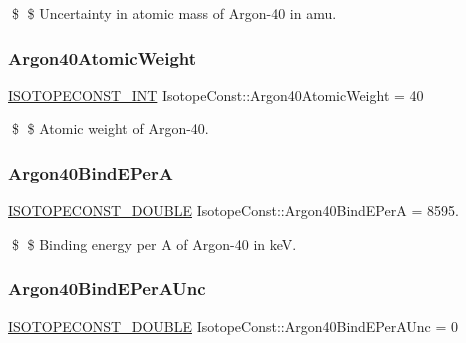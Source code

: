 \$ \$ Uncertainty in atomic mass of Argon-\/40 in amu. \mbox{\label{group___isotope_const-_argon-_ar40_ga756718f3086c996b8d304abd09b94c1a}} 
\subsubsection{\texorpdfstring{Argon40\+Atomic\+Weight}{Argon40AtomicWeight}}
{\footnotesize\ttfamily \mbox{\hyperlink{group___isotope_const-_macros_ga5f18360b3e99483a35c32d789e62621c}{I\+S\+O\+T\+O\+P\+E\+C\+O\+N\+S\+T\+\_\+\+I\+NT}} Isotope\+Const\+::\+Argon40\+Atomic\+Weight = 40}

\$ \$ Atomic weight of Argon-\/40. \mbox{\label{group___isotope_const-_argon-_ar40_ga6fec049790b58dad626c0cb5ead2e817}} 
\subsubsection{\texorpdfstring{Argon40\+Bind\+E\+PerA}{Argon40BindEPerA}}
{\footnotesize\ttfamily \mbox{\hyperlink{group___isotope_const-_macros_ga8f45a7272ce02c0b4c65c44636ed719a}{I\+S\+O\+T\+O\+P\+E\+C\+O\+N\+S\+T\+\_\+\+D\+O\+U\+B\+LE}} Isotope\+Const\+::\+Argon40\+Bind\+E\+PerA = 8595.}

\$ \$ Binding energy per A of Argon-\/40 in keV. \mbox{\label{group___isotope_const-_argon-_ar40_ga9b212a71643c16fc780de85ba5ddd0ac}} 
\subsubsection{\texorpdfstring{Argon40\+Bind\+E\+Per\+A\+Unc}{Argon40BindEPerAUnc}}
{\footnotesize\ttfamily \mbox{\hyperlink{group___isotope_const-_macros_ga8f45a7272ce02c0b4c65c44636ed719a}{I\+S\+O\+T\+O\+P\+E\+C\+O\+N\+S\+T\+\_\+\+D\+O\+U\+B\+LE}} Isotope\+Const\+::\+Argon40\+Bind\+E\+Per\+A\+Unc = 0}

